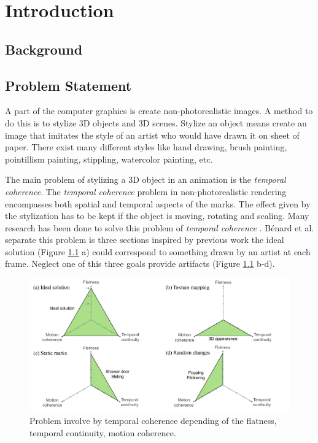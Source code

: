 \chapter{Introduction}


\section{Background}

\section{Problem Statement}

A part of the computer graphics is create non-photorealistic images. A method to do this is to stylize 3D objects and 3D scenes. Stylize an object means create an image that imitates the style of an artist who would have drawn it on sheet of paper. There exist many different styles like hand drawing, brush painting, pointillism painting, stippling, watercolor painting, etc.

The main problem of stylizing a 3D object in an animation is the \textit{temporal coherence}. The \textit{temporal coherence} problem in non-photorealistic rendering encompasses both spatial and temporal aspects of the marks. The effect given by the stylization has to be kept if the object is moving, rotating and scaling. Many research has been done to solve this problem of \textit{temporal coherence} \cite{vergne_implicit_2011, benard_dynamic_2009, bleron_motion-coherent_2018}. Bénard et al. separate this problem is three sections inspired by previous work\cite{meier_painterly_1996, cunzi_dynamic_nodate, breslav_dynamic_nodate, benard_state---art_2011} the ideal solution (Figure \ref{problem_temporal_coherence} a) could correspond to something drawn by an artist at each frame. Neglect one of this three goals provide artifacts (Figure \ref{problem_temporal_coherence} b-d).

\begin{figure}
    \begin{center}
    \includegraphics[scale=0.3]{pics/temporal_coherence.png}
    \end{center}
    \caption{Problem involve by temporal coherence depending of the flatness, temporal continuity, motion coherence.}
    \label{problem_temporal_coherence}
\end{figure}

